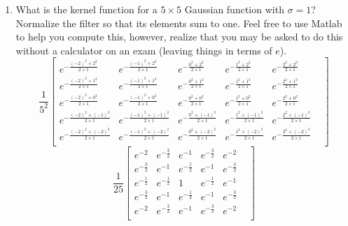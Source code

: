 \documentclass{article}
\begin{document}
\begin{enumerate}
\item What is the kernel function for a $5\times5$ Gaussian function with $\sigma=1$?   Normalize the filter so that its elements sum to one.  Feel free to use Matlab to help you compute this, however, realize that you may be asked to do this without a calculator on an exam (leaving things in terms of $e$).
$$
\frac{1}{5^2}
\begin{bmatrix}
e^{-\frac{(-2)^2+2^2}{2 \times 1}}   &   e^{-\frac{(-1)^2+2^2}{2 \times 1}}   &    e^{-\frac{0^2+2^2}{2 \times 1}}   &     e^{-\frac{1^2+2^2}{2 \times 1}}    &     e^{-\frac{2^2+2^2}{2 \times 1}}    &  \\
e^{-\frac{(-2)^2+1^2}{2 \times 1}}   &   e^{-\frac{(-1)^2+1^2}{2 \times 1}}   &    e^{-\frac{0^2+1^2}{2 \times 1}}   &     e^{-\frac{1^2+1^2}{2 \times 1}}    &     e^{-\frac{2^2+1^2}{2 \times 1}}    &  \\
e^{-\frac{(-2)^2+0^2}{2 \times 1}}   &   e^{-\frac{(-1)^2+0^2}{2 \times 1}}   &    e^{-\frac{0^2+0^2}{2 \times 1}}   &     e^{-\frac{1^2+0^2}{2 \times 1}}    &     e^{-\frac{2^2+0^2}{2 \times 1}}    &  \\
e^{-\frac{(-2)^2+(-1)^2}{2 \times 1}}&   e^{-\frac{(-1)^2+(-1)^2}{2 \times 1}}&    e^{-\frac{0^2+(-1)^2}{2 \times 1}}&     e^{-\frac{1^2+(-1)^2}{2 \times 1}} &     e^{-\frac{2^2+(-1)^2}{2 \times 1}} &  \\
e^{-\frac{(-2)^2+(-2)^2}{2 \times 1}}&   e^{-\frac{(-1)^2+(-2)^2}{2 \times 1}}&    e^{-\frac{0^2+(-2)^2}{2 \times 1}}&     e^{-\frac{1^2+(-2)^2}{2 \times 1}} &     e^{-\frac{2^2+(-2)^2}{2 \times 1}} &  \\


\end{bmatrix}
$$
$$
\frac{1}{25}
\begin{bmatrix}
e^{-2}          &   e^{-\frac{3}{2}}&   e^{-1}          &   e^{-\frac{3}{2}}&    e^{-2}          &  \\
e^{-\frac{3}{2}}&   e^{-1}          &   e^{-\frac{1}{2}}&   e^{-1}          &    e^{-\frac{3}{2}}&  \\
e^{-\frac{1}{2}}&   e^{-\frac{1}{2}}&   1               &   e^{-\frac{1}{2}}&    e^{-1}          &  \\
e^{-\frac{3}{2}}&   e^{-1}          &   e^{-\frac{1}{2}}&   e^{-1}          &    e^{-\frac{3}{2}}&  \\
e^{-2}          &   e^{-\frac{3}{2}}&   e^{-1}          &   e^{-\frac{3}{2}}&    e^{-2}          &  \\
\end{bmatrix}
$$


\end{enumerate}
\end{document}
